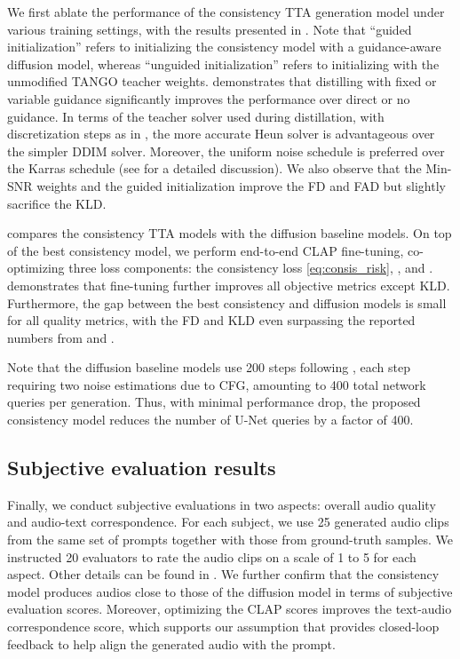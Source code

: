 \documentclass{article}
\begin{document}
We first ablate the performance of the consistency TTA generation model under various training settings, with the results presented in . Note that ``guided initialization'' refers to initializing the consistency model with a guidance-aware diffusion model, whereas ``unguided initialization'' refers to initializing with the unmodified TANGO teacher weights.  demonstrates that distilling with fixed or variable guidance significantly improves the performance over direct or no guidance. In terms of the teacher solver used during distillation, with  discretization steps as in \cite{cm}, the more accurate Heun solver is advantageous over the simpler DDIM solver. Moreover, the uniform noise schedule is preferred over the Karras schedule (see  for a detailed discussion). We also observe that the Min-SNR weights and the guided initialization improve the FD and FAD but slightly sacrifice the KLD.

 compares the consistency TTA models with the diffusion baseline models. On top of the best consistency model, we perform end-to-end CLAP fine-tuning, co-optimizing three loss components: the consistency loss \cref{eq:consis_risk}, , and .  demonstrates that fine-tuning further improves all objective metrics except KLD. Furthermore, the gap between the best consistency and diffusion models is small for all quality metrics, with the FD and KLD even surpassing the reported numbers from \cite{tango} and \cite{audioldm}.

Note that the diffusion baseline models use 200 steps following \cite{audioldm, tango}, each step requiring two noise estimations due to CFG, amounting to 400 total network queries per generation. Thus, with minimal performance drop, the proposed consistency model reduces the number of U-Net queries by a factor of 400.


\subsection{Subjective evaluation results}

Finally, we conduct subjective evaluations in two aspects: overall audio quality and audio-text correspondence. For each subject, we use 25 generated audio clips from the same set of prompts together with those from ground-truth samples. We instructed 20 evaluators to rate the audio clips on a scale of 1 to 5 for each aspect. Other details can be found in . We further confirm that the consistency model produces audios close to those of the diffusion model in terms of subjective evaluation scores. Moreover, optimizing the CLAP scores improves the text-audio correspondence score, which supports our assumption that  provides closed-loop feedback to help align the generated audio with the prompt.
\end{document}
